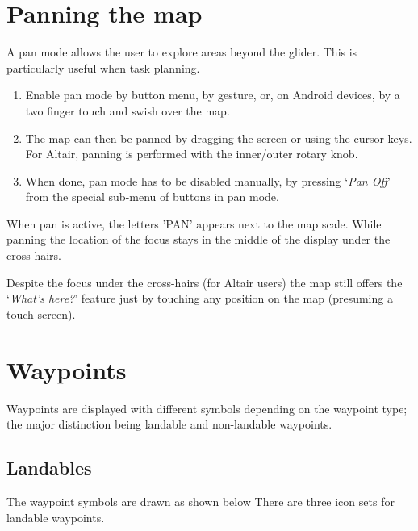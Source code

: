 \section{Panning the map}\label{sec:panning}

A pan mode allows the user to explore areas beyond the glider.  This
is particularly useful when task planning.
\begin{enumerate}
\item Enable pan mode by button menu, by gesture, or, on Android devices, 
  by a two finger touch and swish over the map.
\item The map can then be panned by dragging the screen or using the cursor
  keys.  For Altair, panning is performed with the inner/outer rotary knob.
\item When done, pan mode has to be disabled manually, by pressing `{\it Pan Off}' 
  from the special sub-menu of buttons in pan mode.
\end{enumerate} 

When pan is active, the letters 'PAN' appears next to the map scale.  While
panning the location of the focus stays in the middle of the display under the
cross hairs. 

Despite the focus under the cross-hairs (for Altair users) the map 
still offers the `{\it What's here?}' feature just by touching any 
position on the map (presuming a touch-screen).


\section{Waypoints} \label{sec:waypoint-schemes}
Waypoints are displayed with different symbols depending on the
waypoint type; the major distinction being landable and non-landable
waypoints.

\subsection*{Landables}
The waypoint symbols are drawn as shown below There are three icon sets for
landable waypoints. 

